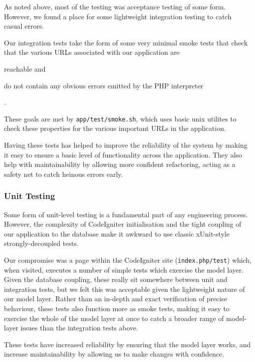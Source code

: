 As noted above, most of the testing was acceptance testing of some
form. However, we found a place for some lightweight integration
testing to catch casual errors.

Our integration tests take the form of some very minimal smoke tests
that check that the various URLs associated with our application are
\begin{inparaenum}
\item reachable and
\item do not contain any obvious errors emitted by the PHP interpreter
\end{inparaenum}.

These goals are met by \verb!app/test/smoke.sh!, which uses basic unix
utilites to check these properties for the various important URLs in
the application.

Having these tests has helped to improve the reliability of the system
by making it easy to ensure a basic level of functionality across the
application. They also help with maintainability by allowing more
confident refactoring, acting as a safety net to catch heinous errors
early.


\subsubsection{Unit Testing}

Some form of unit-level testing is a fundamental part of any
engineering process. However, the complexity of CodeIgniter
initialisation and the tight coupling of our application to the
database make it awkward to use classic xUnit-style strongly-decoupled
tests.

Our compromise was a page within the CodeIgniter site (\verb!index.php/test!) which, when
visited, executes a number of simple tests which exercise the model
layer. Given the database coupling, these really sit somewhere between
unit and integration tests, but we felt this was acceptable given the
lightweight nature of our model layer. Rather than an in-depth and
exact verification of precise behaviour, these tests also function
more as smoke tests, making it easy to exercise the whole of the model
layer at once to catch a broader range of model-layer issues than the
integration tests above.

These tests have increased reliability by ensuring that the model
layer works, and increase maintainability by allowing us to make
changes with confidence.
